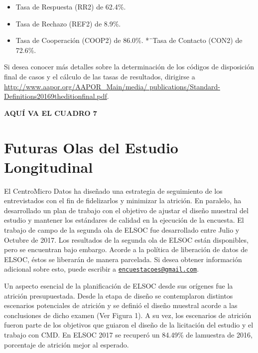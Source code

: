 \documentclass[
]{book}
\providecommand{\tightlist}{%
  \setlength{\itemsep}{0pt}\setlength{\parskip}{0pt}}
\begin{document}
\begin{itemize}
\tightlist
\item
  Tasa de Respuesta (RR2) de 62.4\%.
\item
  Tasa de Rechazo (REF2) de 8.9\%.
\item
  Tasa de Cooperación (COOP2) de 86.0\%. *¨Tasa de Contacto (CON2) de
  72.6\%.
\end{itemize}

Si desea conocer más detalles sobre la determinación de los códigos de
disposición final de casos y el cálculo de las tasas de resultados,
dirigirse a
\href{http://www.aapor.org/AAPOR_Main/media/\%20publications/Standard-Definitions20169theditionfinal.pdf}{http://www.aapor.org/AAPOR\_Main/media/
publications/Standard-Definitions20169theditionfinal.pdf}.

\textbf{AQUÍ VA EL CUADRO 7}

\hypertarget{futuras-olas-del-estudio-longitudinal}{%
\section{Futuras Olas del Estudio
Longitudinal}\label{futuras-olas-del-estudio-longitudinal}}

El CentroMicro Datos ha diseñado una estrategia de seguimiento de los
entrevistados con el fin de fidelizarlos y minimizar la atrición. En
paralelo, ha desarrollado un plan de trabajo con el objetivo de ajustar
el diseño muestral del estudio y mantener los estándares de calidad en
la ejecución de la encuesta. El trabajo de campo de la segunda ola de
ELSOC fue desarrollado entre Julio y Octubre de 2017. Los resultados de
la segunda ola de ELSOC están disponibles, pero se encuentran bajo
embargo. Acorde a la política de liberación de datos de ELSOC, éstos se
liberarán de manera parcelada. Si desea obtener información adicional
sobre esto, puede escribir a
\href{mailto:encuestacoes@gmail.com}{\nolinkurl{encuestacoes@gmail.com}}.

Un aspecto esencial de la planificación de ELSOC desde sus orígenes fue
la atrición presupuestada. Desde la etapa de diseño se contemplaron
distintos escenarios potenciales de atrición y se definió el diseño
muestral acorde a las conclusiones de dicho examen (Ver Figura 1). A su
vez, los escenarios de atrición fueron parte de los objetivos que
guiaron el diseño de la licitación del estudio y el trabajo con CMD. En
ELSOC 2017 se recuperó un 84.49\% de lamuestra de 2016, porcentaje de
atrición mejor al esperado.
\end{document}
